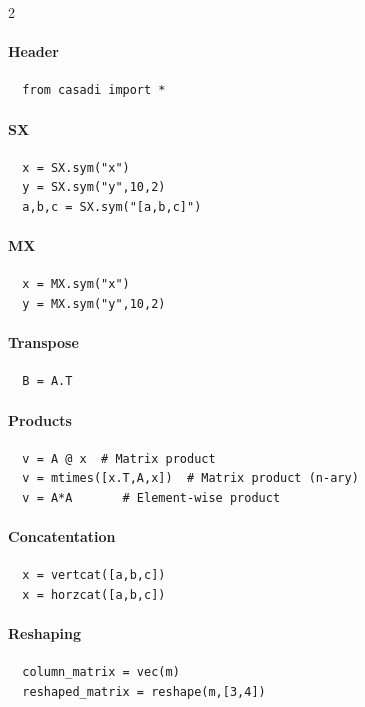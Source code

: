 \documentclass[a4paper,8pt]{article}
\begin{document}
\begin{multicols}{2}

\paragraph{Header}
\begin{verbatim}
  from casadi import *
\end{verbatim}

\paragraph{SX}
\begin{verbatim}
  x = SX.sym("x")
  y = SX.sym("y",10,2)
  a,b,c = SX.sym("[a,b,c]")
\end{verbatim}

\paragraph{MX}
\begin{verbatim}
  x = MX.sym("x")
  y = MX.sym("y",10,2)
\end{verbatim}

\paragraph{Transpose}
\begin{verbatim}
  B = A.T
\end{verbatim}

\paragraph{Products}
\begin{verbatim}
  v = A @ x  # Matrix product
  v = mtimes([x.T,A,x])  # Matrix product (n-ary)
  v = A*A       # Element-wise product
\end{verbatim}

\paragraph{Concatentation}
\begin{verbatim}
  x = vertcat([a,b,c])
  x = horzcat([a,b,c])
\end{verbatim}

\paragraph{Reshaping}
\begin{verbatim}
  column_matrix = vec(m)
  reshaped_matrix = reshape(m,[3,4])
\end{verbatim}


\end{multicols}
\end{document}
